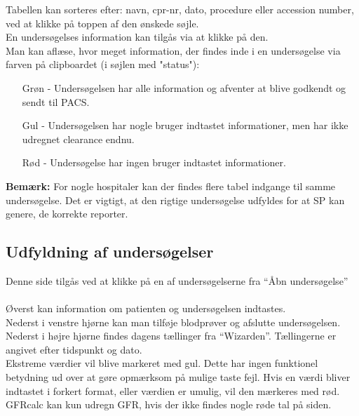\documentclass{article}
\begin{document}
Tabellen kan sorteres efter: navn, cpr-nr, dato, procedure eller accession number, ved at klikke på toppen af den ønskede søjle. \\

En undersøgelses information kan tilgås via at klikke på den. \\

Man kan aflæse, hvor meget information, der findes inde i en undersøgelse via farven på clipboardet (i søjlen med "status"):
\begin{itemize}
	\item[Grøn] - Undersøgelsen har alle information og afventer at blive godkendt og sendt til PACS.
	\item[Gul] - Undersøgelsen har nogle bruger indtastet informationer, men har ikke udregnet clearance endnu. 
	\item[Rød] - Undersøgelse har ingen bruger indtastet informationer. 
\end{itemize} 
\textbf{Bemærk:} For nogle hospitaler kan der findes flere tabel indgange til samme undersøgelse. Det er vigtigt, at den rigtige undersøgelse udfyldes for at  SP kan genere, de korrekte reporter.

\subsection{Udfyldning af undersøgelser}\label{fill_study}
Denne side tilgås ved at klikke på en af undersøgelserne fra “Åbn undersøgelse”\\\\
Øverst kan information om patienten og undersøgelsen indtastes. \\
Nederst i venstre hjørne kan man tilføje blodprøver og afslutte undersøgelsen. \\ 
Nederst i højre hjørne findes dagens tællinger fra “Wizarden”. Tællingerne er angivet efter tidspunkt og dato.  \\

Ekstreme værdier vil blive markeret med gul. Dette har ingen funktionel betydning ud over at gøre opmærksom på mulige taste fejl. Hvis en værdi  bliver indtastet i forkert format, eller værdien er umulig, vil den mærkeres med rød. GFRcalc kan kun udregn GFR, hvis der ikke findes nogle røde tal på siden. \\
\end{document}
